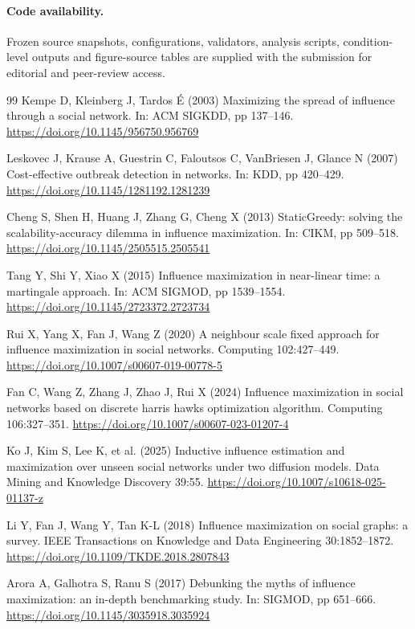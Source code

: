 \documentclass[smallextended]{svjour3}
\begin{document}
\paragraph{Code availability.} Frozen source snapshots, configurations, validators, analysis scripts, condition-level outputs and figure-source tables are supplied with the submission for editorial and peer-review access.
\begin{thebibliography}{99}
 Kempe D, Kleinberg J, Tardos É (2003) Maximizing the spread of influence through a social network. In: ACM SIGKDD, pp 137--146. \url{https://doi.org/10.1145/956750.956769}

 Leskovec J, Krause A, Guestrin C, Faloutsos C, VanBriesen J, Glance N (2007) Cost-effective outbreak detection in networks. In: KDD, pp 420--429. \url{https://doi.org/10.1145/1281192.1281239}

 Cheng S, Shen H, Huang J, Zhang G, Cheng X (2013) StaticGreedy: solving the scalability-accuracy dilemma in influence maximization. In: CIKM, pp 509--518. \url{https://doi.org/10.1145/2505515.2505541}

 Tang Y, Shi Y, Xiao X (2015) Influence maximization in near-linear time: a martingale approach. In: ACM SIGMOD, pp 1539--1554. \url{https://doi.org/10.1145/2723372.2723734}

 Rui X, Yang X, Fan J, Wang Z (2020) A neighbour scale fixed approach for influence maximization in social networks. Computing 102:427--449. \url{https://doi.org/10.1007/s00607-019-00778-5}

 Fan C, Wang Z, Zhang J, Zhao J, Rui X (2024) Influence maximization in social networks based on discrete harris hawks optimization algorithm. Computing 106:327--351. \url{https://doi.org/10.1007/s00607-023-01207-4}

 Ko J, Kim S, Lee K, et al. (2025) Inductive influence estimation and maximization over unseen social networks under two diffusion models. Data Mining and Knowledge Discovery 39:55. \url{https://doi.org/10.1007/s10618-025-01137-z}

 Li Y, Fan J, Wang Y, Tan K-L (2018) Influence maximization on social graphs: a survey. IEEE Transactions on Knowledge and Data Engineering 30:1852--1872. \url{https://doi.org/10.1109/TKDE.2018.2807843}

 Arora A, Galhotra S, Ranu S (2017) Debunking the myths of influence maximization: an in-depth benchmarking study. In: SIGMOD, pp 651--666. \url{https://doi.org/10.1145/3035918.3035924}


\end{thebibliography}
\end{document}
